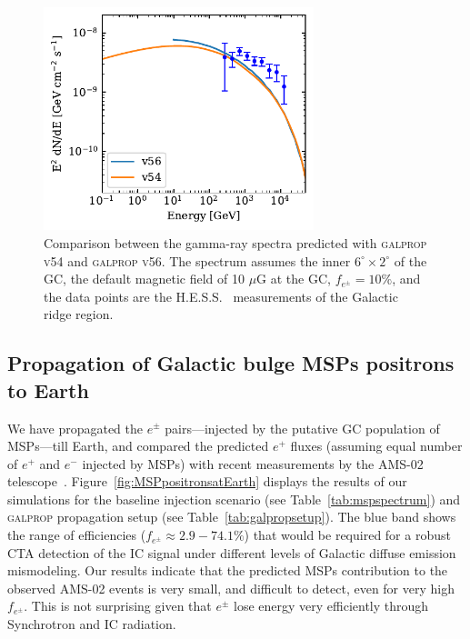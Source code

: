 \documentclass[doublespace,nopageskip]{VTthesis} %
\begin{document}
\begin{figure}[htb]
    \begin{center}
    \includegraphics[width=0.7\textwidth]{Figures/CTA/compare.pdf}
    \caption{Comparison between the gamma-ray spectra predicted with \textsc{galprop v54} and \textsc{galprop v56}. The spectrum assumes the inner $6^\circ \times 2^\circ$ of the GC, the default magnetic field of 10 $\mu$G at the GC, $f_{e^\pm}=10\%$, and the data points are the H.E.S.S.~\citep{Aharonian:2006au} measurements of the Galactic ridge region.   }\label{fig:compareV54andV56}
    \end{center}
\end{figure}
 
\subsection{Propagation of Galactic bulge MSPs positrons to Earth}
 
We have propagated the $e^\pm$ pairs---injected by the putative GC population of MSPs---till Earth, and compared the predicted $e^+$ fluxes (assuming equal number of $e^+$ and $e^-$ injected by MSPs) with recent measurements by the AMS-02 telescope~\citep{Aguilar:2021tos}. Figure~\ref{fig:MSPpositronsatEarth} displays the results of our simulations for the baseline injection scenario (see Table~\ref{tab:mspspectrum}) and \textsc{galprop} propagation setup (see Table~\ref{tab:galpropsetup}). The blue band shows the range of efficiencies ($f_{e^\pm}\approx 2.9-74.1\%$) that would be required for a robust CTA detection of the IC signal under different levels of Galactic diffuse emission mismodeling. Our results indicate that the predicted MSPs contribution to the observed AMS-02 events is very small, and difficult to detect, even for very high $f_{e^\pm}$. This is not surprising given that $e^\pm$ lose energy very efficiently through Synchrotron and IC radiation.
\end{document}
